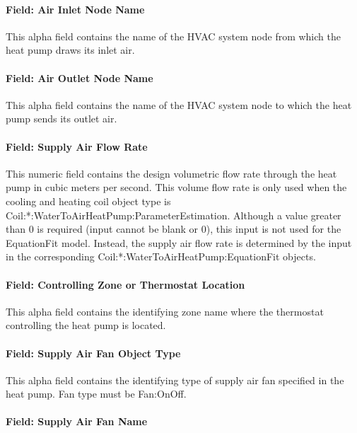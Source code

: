 \paragraph{Field: Air Inlet Node Name}\label{field-air-inlet-node-name-2-002}

This alpha field contains the name of the HVAC system node from which the heat pump draws its inlet air.

\paragraph{Field: Air Outlet Node Name}\label{field-air-outlet-node-name-2-002}

This alpha field contains the name of the HVAC system node to which the heat pump sends its outlet air.

\paragraph{Field: Supply Air Flow Rate}\label{field-supply-air-flow-rate}

This numeric field contains the design volumetric flow rate through the heat pump in cubic meters per second. This volume flow rate is only used when the cooling and heating coil object type is Coil:*:WaterToAirHeatPump:ParameterEstimation. Although a value greater than 0 is required (input cannot be blank or 0), this input is not used for the EquationFit model. Instead, the supply air flow rate is determined by the input in the corresponding Coil:*:WaterToAirHeatPump:EquationFit objects.

\paragraph{Field: Controlling Zone or Thermostat Location}\label{field-controlling-zone-or-thermostat-location-7}

This alpha field contains the identifying zone name where the thermostat controlling the heat pump is located.

\paragraph{Field: Supply Air Fan Object Type}\label{field-supply-air-fan-object-type-2}

This alpha field contains the identifying type of supply air fan specified in the heat pump. Fan type must be Fan:OnOff.

\paragraph{Field: Supply Air Fan Name}\label{field-supply-air-fan-name-2}

